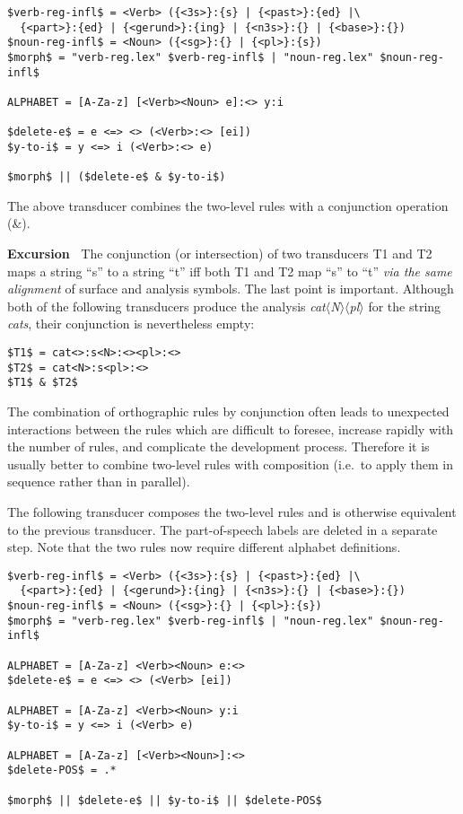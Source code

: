 \documentclass[11pt]{article}
\newenvironment{excursion}{

  \hrulefill\nopagebreak

  \textbf{Excursion~}}
{

  \nopagebreak\hrulefill\vspace{0.2cm}

}
\begin{document}
\begin{verbatim}
$verb-reg-infl$ = <Verb> ({<3s>}:{s} | {<past>}:{ed} |\
  {<part>}:{ed} | {<gerund>}:{ing} | {<n3s>}:{} | {<base>}:{})
$noun-reg-infl$ = <Noun> ({<sg>}:{} | {<pl>}:{s})
$morph$ = "verb-reg.lex" $verb-reg-infl$ | "noun-reg.lex" $noun-reg-infl$

ALPHABET = [A-Za-z] [<Verb><Noun> e]:<> y:i

$delete-e$ = e <=> <> (<Verb>:<> [ei])
$y-to-i$ = y <=> i (<Verb>:<> e)

$morph$ || ($delete-e$ & $y-to-i$)
\end{verbatim}

The above transducer combines the two-level rules with a conjunction
operation (\&). 

\begin{excursion}
  The conjunction (or intersection) of two transducers T1 and T2 maps
  a string ``s'' to a string ``t'' iff both T1 and T2 map ``s'' to
  ``t'' \emph{via the same alignment} of surface and analysis symbols.
  The last point is important. Although both of the following
  transducers produce the analysis \emph{cat$\langle$N$\rangle$$\langle$pl$\rangle$} for the string
  \emph{cats}, their conjunction is nevertheless empty:

\begin{verbatim}
$T1$ = cat<>:s<N>:<><pl>:<>
$T2$ = cat<N>:s<pl>:<>
$T1$ & $T2$
\end{verbatim}

\end{excursion}

The combination of orthographic rules by conjunction often leads to
unexpected interactions between the rules which are difficult to
foresee, increase rapidly with the number of rules, and complicate the
development process. Therefore it is usually better to combine
two-level rules with composition (i.e.\ to apply them in sequence
rather than in parallel).

The following transducer composes the two-level rules and is otherwise
equivalent to the previous transducer. The part-of-speech labels are
deleted in a separate step. Note that the two rules now require
different alphabet definitions.

\begin{verbatim}
$verb-reg-infl$ = <Verb> ({<3s>}:{s} | {<past>}:{ed} |\
  {<part>}:{ed} | {<gerund>}:{ing} | {<n3s>}:{} | {<base>}:{})
$noun-reg-infl$ = <Noun> ({<sg>}:{} | {<pl>}:{s})
$morph$ = "verb-reg.lex" $verb-reg-infl$ | "noun-reg.lex" $noun-reg-infl$

ALPHABET = [A-Za-z] <Verb><Noun> e:<>
$delete-e$ = e <=> <> (<Verb> [ei])

ALPHABET = [A-Za-z] <Verb><Noun> y:i
$y-to-i$ = y <=> i (<Verb> e)

ALPHABET = [A-Za-z] [<Verb><Noun>]:<>
$delete-POS$ = .*

$morph$ || $delete-e$ || $y-to-i$ || $delete-POS$
\end{verbatim}
\end{document}
